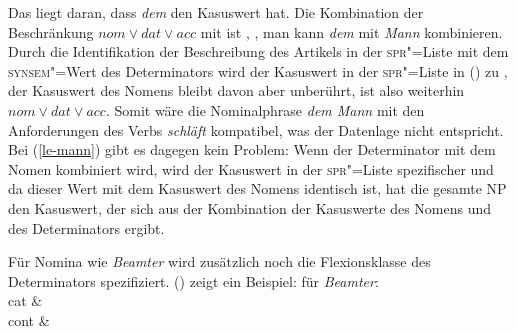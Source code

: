 \z
{}
\z
Das liegt daran, dass \emph{dem} den Kasuswert  hat. Die Kombination der Beschränkung
$nom \vee dat \vee acc$ mit  ist , \dash, man kann \emph{dem}
mit \emph{Mann} kombinieren. Durch die Identifikation der Beschreibung des Artikels
in der \textsc{spr}"=Liste mit dem \textsc{synsem}"=Wert des Determinators wird der Kasuswert
in der \textsc{spr}"=Liste in () zu , der Kasuswert des Nomens bleibt
davon aber unberührt, ist also weiterhin $nom \vee dat \vee acc$. Somit wäre die Nominalphrase
\emph{dem Mann} mit den Anforderungen des Verbs \emph{schläft} kompatibel, was der
Datenlage nicht entspricht.
Bei (\ref{le-mann}) gibt es dagegen kein Problem: Wenn der Determinator mit dem Nomen
kombiniert wird, wird der Kasuswert in der \textsc{spr}"=Liste spezifischer und da dieser
Wert mit dem Kasuswert des Nomens identisch ist, hat die gesamte NP den Kasuswert, der
sich aus der Kombination der Kasuswerte des Nomens und des Determinators ergibt.


Für Nomina wie \emph{Beamter} wird zusätzlich noch die Flexionsklasse des Determinators
spezifiziert. () zeigt ein Beispiel:
\ea
\label{le-beamter}%
\localw für \emph{Beamter}:\\
\ms
{ cat &  \\
  cont &  \\
}
\z

